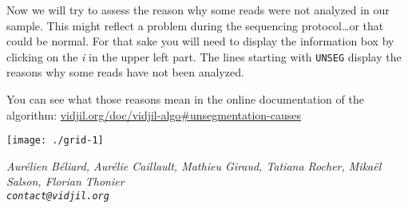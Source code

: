 \documentclass[10pt]{article}
\begin{document}
Now we will try to assess the reason why some reads were not analyzed in our
sample.
This might reflect a problem during the sequencing protocol\dots or that could
be normal.
For that sake you will need to display the information box by clicking on the
\textit{i} in the upper left part.
The lines starting with \texttt{UNSEG} display the reasons why some reads have
not been analyzed.

You can see what those reasons mean in the online documentation of the
algorithm: \href{http://www.vidjil.org/doc/vidjil-algo\#unsegmentation-causes}{vidjil.org/doc/vidjil-algo\#unsegmentation-causes
}



\bigskip

\bigskip

\centerline{\texttt{[image: ./grid-1]}}

\newpage







\vfill
\flushright \it Aurélien Béliard, Aurélie Caillault, Mathieu Giraud, Tatiana Rocher, Mikaël Salson, Florian Thonier
\\ \texttt{contact@vidjil.org}
\end{document}
